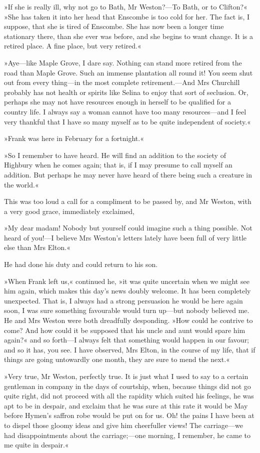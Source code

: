 »If she is really ill, why not go to Bath, Mr Weston?—To Bath, or to Clifton?« »She has taken it into her head that Enscombe is too cold for her. The fact is, I suppose, that she is tired of Enscombe. She has now been a longer time stationary there, than she ever was before, and she begins to want change. It is a retired place. A fine place, but very retired.«

»Aye—like Maple Grove, I dare say. Nothing can stand more retired from the road than Maple Grove. Such an immense plantation all round it! You seem shut out from every thing—in the most complete retirement.—And Mrs Churchill probably has not health or spirits like Selina to enjoy that sort of seclusion. Or, perhaps she may not have resources enough in herself to be qualified for a country life. I always say a woman cannot have too many resources—and I feel very thankful that I have so many myself as to be quite independent of society.«

»Frank was here in February for a fortnight.«

»So I remember to have heard. He will find an addition to the society of Highbury when he comes again; that is, if I may presume to call myself an addition. But perhaps he may never have heard of there being such a creature in the world.«

This was too loud a call for a compliment to be passed by, and Mr Weston, with a very good grace, immediately exclaimed,

»My dear madam! Nobody but yourself could imagine such a thing possible. Not heard of you!—I believe Mrs Weston's letters lately have been full of very little else than Mrs Elton.«

He had done his duty and could return to his son.

»When Frank left us,« continued he, »it was quite uncertain when we might see him again, which makes this day's news doubly welcome. It has been completely unexpected. That is, I always had a strong persuasion he would be here again soon, I was sure something favourable would turn up—but nobody believed me. He and Mrs Weston were both dreadfully desponding. »How could he contrive to come? And how could it be supposed that his uncle and aunt would spare him again?« and so forth—I always felt that something would happen in our favour; and so it has, you see. I have observed, Mrs Elton, in the course of my life, that if things are going untowardly one month, they are sure to mend the next.«

»Very true, Mr Weston, perfectly true. It is just what I used to say to a certain gentleman in company in the days of courtship, when, because things did not go quite right, did not proceed with all the rapidity which suited his feelings, he was apt to be in despair, and exclaim that he was sure at this rate it would be May before Hymen's saffron robe would be put on for us. Oh! the pains I have been at to dispel those gloomy ideas and give him cheerfuller views! The carriage—we had disappointments about the carriage;—one morning, I remember, he came to me quite in despair.«

